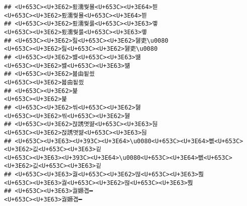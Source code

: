 \documentclass[]{article}
\begin{document}
\begin{verbatim}
## <U+653C><U+3E62>룄濡쒖묠<U+653C><U+3E64>븯                                                                                                                                                                 <U+653C><U+3E62>룄濡쒖묠<U+653C><U+3E64>븯
## <U+653C><U+3E62>룄濡쒗룷<U+653C><U+3E63>옣                                                                                                                                                                 <U+653C><U+3E62>룄濡쒗룷<U+653C><U+3E63>옣
## <U+653C><U+3E62>릺<U+653C><U+3E62>뒗吏\u0080                                                                                                                                                             <U+653C><U+3E62>릺<U+653C><U+3E62>뒗吏\u0080
## <U+653C><U+3E62>뱷<U+653C><U+3E63>떎                                                                                                                                                                             <U+653C><U+3E62>뱷<U+653C><U+3E63>떎
## <U+653C><U+3E62>뵲由됱씠                                                                                                                                                                                         <U+653C><U+3E62>뵲由됱씠
## <U+653C><U+3E62>븙                                                                                                                                                                                                     <U+653C><U+3E62>븙
## <U+653C><U+3E62>씪<U+653C><U+3E62>뒗                                                                                                                                                                             <U+653C><U+3E62>씪<U+653C><U+3E62>뒗
## <U+653C><U+3E62>젅誘몃땲<U+653C><U+3E63>뒪                                                                                                                                                                 <U+653C><U+3E62>젅誘몃땲<U+653C><U+3E63>뒪
## <U+653C><U+3E63><U+393C><U+3E64>\u0080<U+653C><U+3E64>뻾<U+653C><U+3E62>깂<U+653C><U+3E63>깉                                                                                                 <U+653C><U+3E63><U+393C><U+3E64>\u0080<U+653C><U+3E64>뻾<U+653C><U+3E62>깂<U+653C><U+3E63>깉
## <U+653C><U+3E63>궗<U+653C><U+3E62>떦<U+653C><U+3E63>뿭                                                                                                                                                     <U+653C><U+3E63>궗<U+653C><U+3E62>떦<U+653C><U+3E63>뿭
## <U+653C><U+3E63>궗嫄곕━                                                                                                                                                                                         <U+653C><U+3E63>궗嫄곕━

\end{verbatim}
\end{document}
